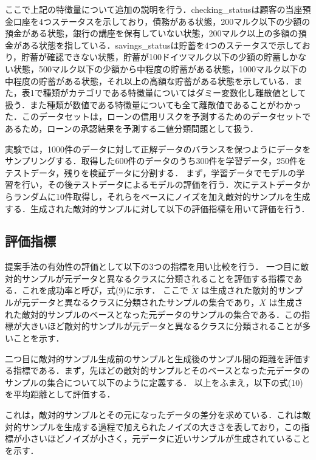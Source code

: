 ここで上記の特徴量について追加の説明を行う．checking\_statusは顧客の当座預金口座を4つステータスを示しており，債務がある状態，200マルク以下の少額の預金がある状態，銀行の講座を保有していない状態，200マルク以上の多額の預金がある状態を指している．savings\_statusは貯蓄を4つのステータスで示しており，貯蓄が確認できない状態，貯蓄が100ドイツマルク以下の少額の貯蓄しかない状態，500マルク以下の少額から中程度の貯蓄がある状態，1000マルク以下の中程度の貯蓄がある状態，それ以上の高額な貯蓄がある状態を示している．また，表1で種類がカテゴリである特徴量についてはダミー変数化し離散値として扱う．また種類が数値である特徴量についても全て離散値であることがわかった．このデータセットは，ローンの信用リスクを予測するためのデータセットであるため，ローンの承認結果を予測する二値分類問題として扱う．

実験では，1000件のデータに対して正解データのバランスを保つようにデータをサンプリングする．取得した600件のデータのうち300件を学習データ，250件をテストデータ，残りを検証データに分割する．
まず，学習データでモデルの学習を行い，その後テストデータによるモデルの評価を行う．次にテストデータからランダムに10件取得し，それらをベースにノイズを加え敵対的サンプルを生成する．生成された敵対的サンプルに対して以下の評価指標を用いて評価を行う．

\subsection{評価指標}
提案手法の有効性の評価として以下の3つの指標を用い比較を行う．
一つ目に敵対的サンプルが元データと異なるクラスに分類されることを評価する指標である．これを成功率と呼び，式(9)に示す．
ここで $\tilde{X}$ は生成された敵対的サンプルが元データと異なるクラスに分類されたサンプルの集合であり，$X$ は生成された敵対的サンプルのベースとなった元データのサンプルの集合である．この指標が大きいほど敵対的サンプルが元データと異なるクラスに分類されることが多いことを示す．

二つ目に敵対的サンプル生成前のサンプルと生成後のサンプル間の距離を評価する指標である．まず，先ほどの敵対的サンプルとそのベースとなった元データのサンプルの集合について以下のように定義する．
以上をふまえ，以下の式(10)を平均距離として評価する．

これは，敵対的サンプルとその元になったデータの差分を求めている．これは敵対的サンプルを生成する過程で加えられたノイズの大きさを表しており，この指標が小さいほどノイズが小さく，元データに近いサンプルが生成されていることを示す．

